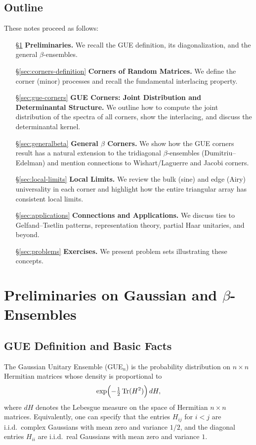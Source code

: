 \documentclass[letterpaper,11pt,oneside,reqno]{article}
\numberwithin{equation}{section}
\theoremstyle{definition}
\begin{document}
\subsection{Outline}
These notes proceed as follows:
\begin{itemize}
\item[\S\ref{sec:preliminaries}] \textbf{Preliminaries.} We recall the GUE definition, its diagonalization, and the general $\beta$-ensembles.
\item[\S\ref{sec:corners-definition}] \textbf{Corners of Random Matrices.} We define the corner (minor) processes and recall the fundamental interlacing property.
\item[\S\ref{sec:gue-corners}] \textbf{GUE Corners: Joint Distribution and Determinantal Structure.} We outline how to compute the joint distribution of the spectra of all corners, show the interlacing, and discuss the determinantal kernel.
\item[\S\ref{sec:generalbeta}] \textbf{General $\beta$ Corners.} We show how the GUE corners result has a natural extension to the tridiagonal $\beta$-ensembles (Dumitriu--Edelman) and mention connections to Wishart/Laguerre and Jacobi corners.
\item[\S\ref{sec:local-limits}] \textbf{Local Limits.} We review the bulk (sine) and edge (Airy) universality in each corner and highlight how the entire triangular array has consistent local limits.
\item[\S\ref{sec:applications}] \textbf{Connections and Applications.} We discuss ties to Gelfand--Tsetlin patterns, representation theory, partial Haar unitaries, and beyond.
\item[\S\ref{sec:problems}] \textbf{Exercises.} We present problem sets illustrating these concepts.
\end{itemize}

\section{Preliminaries on Gaussian and $\beta$-Ensembles}
\label{sec:preliminaries}

\subsection{GUE Definition and Basic Facts}
The Gaussian Unitary Ensemble (GUE$_n$) is the probability distribution on $n\times n$ Hermitian matrices whose density is proportional to
\[
	\exp\Bigl(-\tfrac{1}{2}\,\mathrm{Tr}(H^2)\Bigr)\,dH,
\]
where $dH$ denotes the Lebesgue measure on the space of Hermitian $n\times n$ matrices. Equivalently, one can specify that the entries $H_{ij}$ for $i<j$ are i.i.d.\ complex Gaussians with mean zero and variance $1/2$, and the diagonal entries $H_{ii}$ are i.i.d.\ real Gaussians with mean zero and variance $1$.
\end{document}
